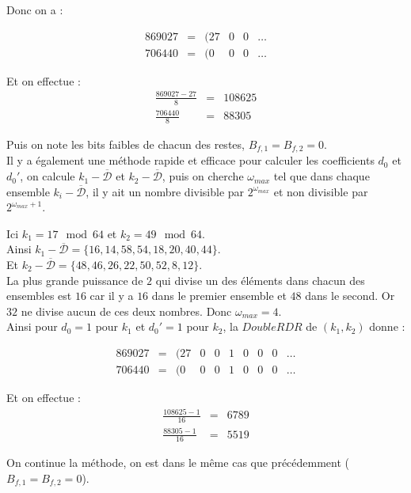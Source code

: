 \documentclass[12pt, a4paper]{memoir}
\newcommand{\dbarre}{\overline{\mathcal{D}}}
\begin{document}
 
 Donc on a :
 
 $$\begin{array}{cccccc}
  869027 & = & (27 & 0 & 0 & \ldots \\
  706440 & = & (0 & 0 & 0 & \ldots
 \end{array}$$
 
 Et on effectue :
 $$\begin{array}{cccccc}
  \frac{869027 - 27}{8} & = & 108625 \\
  \frac{706440}{8} & = & 88305
 \end{array}$$
 
Puis on note les bits faibles de chacun des restes, $B_{f,1} = B_{f,2} = 0$. \\
Il y a également une méthode rapide et efficace pour calculer les coefficients $d_0$ et $d_0'$, on calcule
$k_1 - \dbarre$ et $k_2 - \dbarre$, puis on cherche $\omega_{max}$ tel que dans chaque ensemble $k_i - \dbarre$, 
il y ait un nombre divisible par $2^{\omega_{max}}$ et non divisible par $2^{\omega_{max}+1}$.

Ici $k_1 = 17 \mod 64$ et $k_2 = 49 \mod 64$. \\
Ainsi  $k_1 - \dbarre = \{16,14,58,54,18,20,40,44\}$. \\
Et  $k_2 - \dbarre = \{48,46,26,22,50,52,8,12\}$. \\ 
La plus grande puissance de $2$ qui divise un des éléments dans chacun des ensembles est $16$
car il y a $16$ dans le premier ensemble et $48$ dans le second. Or $32$ ne divise aucun de ces deux nombres. 
Donc $\omega_{max} = 4$. \\
Ainsi pour $d_0 = 1$ pour $k_1$ et $d_0' = 1$ pour $k_2$, la $DoubleRDR$ de $(k_1,k_2)$ donne :

 $$\begin{array}{cccccccccc}
  869027 & = & (27 & 0 & 0 & 1 & 0 & 0 & 0 & \ldots \\
  706440 & = & (0 & 0 & 0 & 1 & 0 & 0 & 0 & \ldots
 \end{array}$$
 
 Et on effectue :
 $$\begin{array}{cccccc}
  \frac{108625 - 1}{16} & = & 6789 \\
  \frac{88305-1}{16} & = & 5519
 \end{array}$$
 
 On continue la méthode, on est dans le même cas que précédemment ($B_{f,1} = B_{f,2} = 0$).
 
\end{document}
